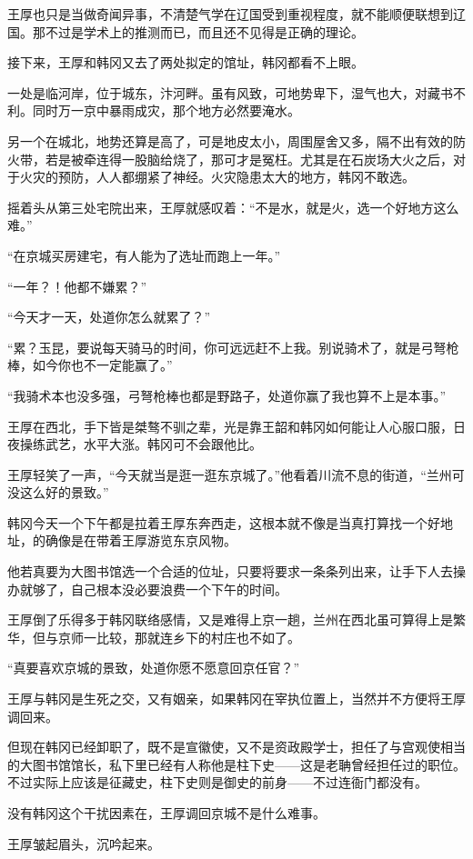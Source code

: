 王厚也只是当做奇闻异事，不清楚气学在辽国受到重视程度，就不能顺便联想到辽国。那不过是学术上的推测而已，而且还不见得是正确的理论。

接下来，王厚和韩冈又去了两处拟定的馆址，韩冈都看不上眼。

一处是临河岸，位于城东，汴河畔。虽有风致，可地势卑下，湿气也大，对藏书不利。同时万一京中暴雨成灾，那个地方必然要淹水。

另一个在城北，地势还算是高了，可是地皮太小，周围屋舍又多，隔不出有效的防火带，若是被牵连得一股脑给烧了，那可才是冤枉。尤其是在石炭场大火之后，对于火灾的预防，人人都绷紧了神经。火灾隐患太大的地方，韩冈不敢选。

摇着头从第三处宅院出来，王厚就感叹着：“不是水，就是火，选一个好地方这么难。”

“在京城买房建宅，有人能为了选址而跑上一年。”

“一年？！他都不嫌累？”

“今天才一天，处道你怎么就累了？”

“累？玉昆，要说每天骑马的时间，你可远远赶不上我。别说骑术了，就是弓弩枪棒，如今你也不一定能赢了。”

“我骑术本也没多强，弓弩枪棒也都是野路子，处道你赢了我也算不上是本事。”

王厚在西北，手下皆是桀骜不驯之辈，光是靠王韶和韩冈如何能让人心服口服，日夜操练武艺，水平大涨。韩冈可不会跟他比。

王厚轻笑了一声，“今天就当是逛一逛东京城了。”他看着川流不息的街道，“兰州可没这么好的景致。”

韩冈今天一个下午都是拉着王厚东奔西走，这根本就不像是当真打算找一个好地址，的确像是在带着王厚游览东京风物。

他若真要为大图书馆选一个合适的位址，只要将要求一条条列出来，让手下人去操办就够了，自己根本没必要浪费一个下午的时间。

王厚倒了乐得多于韩冈联络感情，又是难得上京一趟，兰州在西北虽可算得上是繁华，但与京师一比较，那就连乡下的村庄也不如了。

“真要喜欢京城的景致，处道你愿不愿意回京任官？”

王厚与韩冈是生死之交，又有姻亲，如果韩冈在宰执位置上，当然并不方便将王厚调回来。

但现在韩冈已经卸职了，既不是宣徽使，又不是资政殿学士，担任了与宫观使相当的大图书馆馆长，私下里已经有人称他是柱下史——这是老聃曾经担任过的职位。不过实际上应该是征藏史，柱下史则是御史的前身——不过连衙门都没有。

没有韩冈这个干扰因素在，王厚调回京城不是什么难事。

王厚皱起眉头，沉吟起来。

